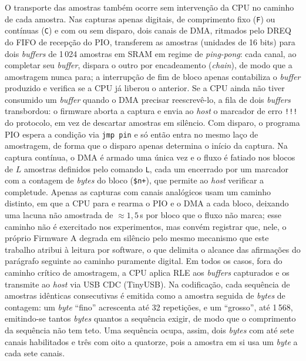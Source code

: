 O transporte das amostras também ocorre sem intervenção da \ac{CPU} no caminho
de cada amostra. Nas capturas apenas digitais, de comprimento fixo
(\texttt{F}) ou contínuas (\texttt{C}) e com ou sem disparo, dois canais de
\ac{DMA}, ritmados pelo \ac{DREQ} do \ac{FIFO} de recepção do \ac{PIO}, transferem as amostras
(unidades de 16 bits) para dois \emph{buffers} de 1\,024 amostras em \ac{SRAM} em
regime de \emph{ping-pong}: cada canal, ao completar seu \emph{buffer},
dispara o outro por encadeamento (\emph{chain}), de modo que a amostragem
nunca para; a interrupção de fim de bloco apenas contabiliza o \emph{buffer}
produzido e verifica se a \ac{CPU} já liberou o anterior. Se a \ac{CPU} ainda não tiver
consumido um \emph{buffer} quando o \ac{DMA} precisar reescrevê-lo, a fila de dois
\emph{buffers} transbordou: o firmware aborta a captura e envia ao \emph{host} o
marcador de erro \texttt{!!!} do protocolo, em vez de descartar amostras em
silêncio. Com disparo, o programa \ac{PIO} espera a condição via \texttt{jmp pin} e
só então entra no mesmo laço de amostragem, de forma que o disparo apenas
determina o início da captura. Na captura contínua, o \ac{DMA} é armado uma única
vez e o fluxo é fatiado nos blocos de $L$ amostras definidos pelo comando
\texttt{L}, cada um encerrado por um marcador com a contagem de \emph{bytes}
do bloco (\texttt{\$n+}), que permite ao \emph{host} verificar a completude. Apenas
as capturas com canais analógicos usam um caminho distinto, em que a \ac{CPU}
para e rearma o \ac{PIO} e o \ac{DMA} a cada bloco, deixando uma lacuna não
amostrada de $\approx 1{,}5$\,\textmu s por bloco que o fluxo não marca; esse
caminho não é exercitado nos experimentos, mas convém registrar que, nele, o
próprio Firmware A degrada em silêncio pelo mesmo mecanismo que este trabalho
atribui à leitura por software, o que delimita o alcance das afirmações do
parágrafo seguinte ao caminho puramente digital.
Em todos os casos, fora do caminho crítico de amostragem, a \ac{CPU} aplica \ac{RLE}
aos \emph{buffers} capturados e os transmite ao \emph{host} via \ac{USB}
\ac{CDC} (TinyUSB). Na codificação, cada sequência de amostras idênticas
consecutivas é emitida como a amostra seguida de \emph{bytes} de contagem: um
\emph{byte} ``fino'' acrescenta até 32 repetições, e um ``grosso'', até 1\,568,
emitindo-se tantos \emph{bytes} quantos a sequência exigir, de modo que o
comprimento da sequência não tem teto. Uma sequência ocupa, assim, dois
\emph{bytes} com até sete canais habilitados e três com oito a quatorze, pois
a amostra em si usa um \emph{byte} a cada sete canais.

